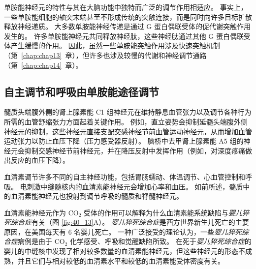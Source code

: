 单胺能神经元的特性与其在大脑功能中独特而广泛的调节作用相适应。
事实上，一些单胺能细胞的轴突末端甚至不形成传统的突触连接，而是同时向许多目标扩散释放神经递质。
大多数单胺能神经传递是通过 G 蛋白偶联受体的促代谢突触作用发生的。
许多单胺能神经元共同释放神经肽，这些神经肽通过其他 G 蛋白偶联受体产生缓慢的作用。
因此，虽然一些单胺能突触作用涉及快速突触机制（第~\ref{chap:chap13}~章），但许多也涉及较慢的代谢和神经调节通路（第~\ref{chap:chap14}~章）。



\subsection{自主调节和呼吸由单胺能途径调节}

髓质头端腹外侧的肾上腺素能 C1 组神经元在维持静息血管张力以及调节各种行为所需的血管舒缩张力方面起着关键作用。
例如，直立姿势会抑制延髓头端腹外侧神经元的抑制，这些神经元直接支配交感神经节前血管运动神经元，从而增加血管运动张力以防止血压下降（压力感受器反射）。
脑桥中去甲肾上腺素能 A5 组的神经元会抑制交感神经节前神经元，并在降压反射中发挥作用（例如，对深度疼痛做出反应的血压下降）。


血清素调节许多不同的自主神经功能，包括胃肠蠕动、体温调节、心血管控制和呼吸。
电刺激中缝髓核内的血清素能神经元会增加心率和血压。
如前所述，髓质中的血清素能神经元也投射到调节呼吸的髓质和脊髓神经元。


血清素能神经元作为 CO$_2$ 受体的作用可以解释为什么血清素能系统缺陷与\textit{婴儿猝死综合症}有关（图 \ref{fig:40_13}A）。
\textit{婴儿猝死综合症}是西方世界新生儿死亡的主要原因，在美国每天有 6 名婴儿死亡。
一种广泛接受的理论认为，一些\textit{婴儿猝死综合症}病例是由于 CO$_2$ 化学感受、呼吸和觉醒缺陷所致。
在死于\textit{婴儿猝死综合症}的婴儿的中缝核中发现了相对较多数量的血清素能神经元，但这些神经元的形态不成熟，并且它们与相对较低的血清素水平和较低的血清素能受体密度有关。


